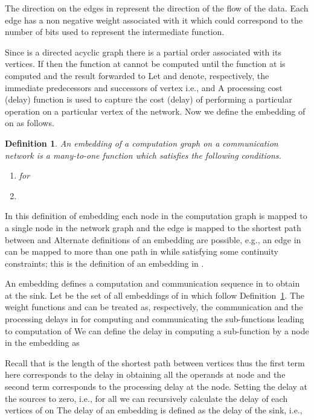 \documentclass[journal]{IEEEtran}
\newtheorem{definition}{{\bf Definition}}
\begin{document}
The direction on the edges in  represent the direction of
the flow of the data.  Each edge 
has a non negative weight  associated with
it which could correspond to the number of bits used to represent the
intermediate function. 

Since  is a directed acyclic graph there is a partial
order associated with its vertices. If  then the function at  cannot be computed until
the function at  is computed and the result forwarded to
 Let  and  denote,
respectively, the immediate predecessors and successors of vertex
 i.e.,  and 
A processing cost (delay) function  is used to capture the cost (delay) of
performing a particular operation on a particular vertex of the
network. Now we define the embedding of  on  as
follows.
\begin{definition}
  \label{def:embedding}
  An embedding of a computation graph  on a communication
  network  is a many-to-one function  which satisfies the following conditions. 
  \begin{enumerate}
  \item  for 
  \item 
  \end{enumerate}
\end{definition}
In this definition of embedding each node in the computation graph is
mapped to a single node in the network graph and the edge
 is mapped to the shortest path
between  and  Alternate
definitions of an embedding are possible, e.g., an edge in
 can be mapped to more than one path in  while
satisfying some continuity constraints; this is the definition of an
embedding in \cite{Shah13}. 

An embedding defines a computation and communication
sequence in  to obtain  at the sink. Let 
be the set of all embeddings of  in  which
follow Definition~\ref{def:embedding}.  The weight functions  and
 can be treated as, respectively, the communication and the
processing delays in  for computing and communicating the
sub-functions leading to computation of  We can define the delay in
computing a sub-function by a node  in the
embedding  as
 
Recall that  is the length of the shortest path between
vertices  thus the first term here corresponds to
the delay in obtaining all the operands at node 
and the second term corresponds to the processing delay at the
node. Setting the delay at the sources to zero, i.e.,
 for all  we can
recursively calculate the delay of each vertices of  on
 The delay  of an embedding  is defined
 as the delay of the sink, i.e., 
\end{document}

